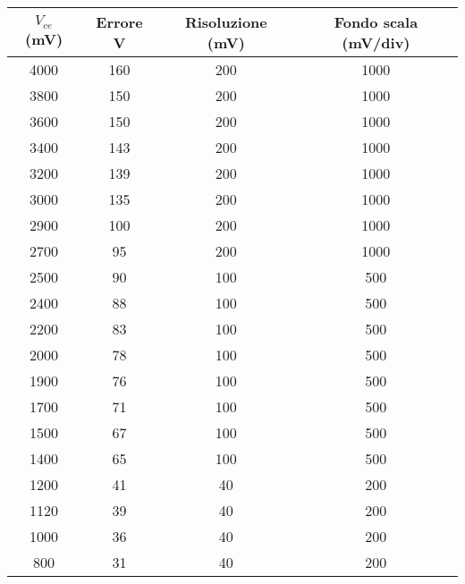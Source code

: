 \documentclass{article}
\begin{document}
\begin{table}[H]
    \centering
    \begin{tabular}{|c|c|c|c|}
    \hline
    $V_{ce}$ (mV) & Errore V & Risoluzione (mV) & Fondo scala (mV/div) \\ \hline
    4000          & 160      & 200              & 1000                 \\ \hline
    3800          & 150      & 200              & 1000                 \\ \hline
    3600          & 150      & 200              & 1000                 \\ \hline
    3400          & 143      & 200              & 1000                 \\ \hline
    3200          & 139      & 200              & 1000                 \\ \hline
    3000          & 135      & 200              & 1000                 \\ \hline
    2900          & 100      & 200              & 1000                 \\ \hline
    2700          & 95       & 200              & 1000                 \\ \hline
    2500          & 90       & 100              & 500                  \\ \hline
    2400          & 88       & 100              & 500                  \\ \hline
    2200          & 83       & 100              & 500                  \\ \hline
    2000          & 78       & 100              & 500                  \\ \hline
    1900          & 76       & 100              & 500                  \\ \hline
    1700          & 71       & 100              & 500                  \\ \hline
    1500          & 67       & 100              & 500                  \\ \hline
    1400          & 65       & 100              & 500                  \\ \hline
    1200          & 41       & 40               & 200                  \\ \hline
    1120          & 39       & 40               & 200                  \\ \hline
    1000          & 36       & 40               & 200                  \\ \hline
    800           & 31       & 40               & 200                  \\ \hline

\end{tabular}
\end{table}
\end{document}
